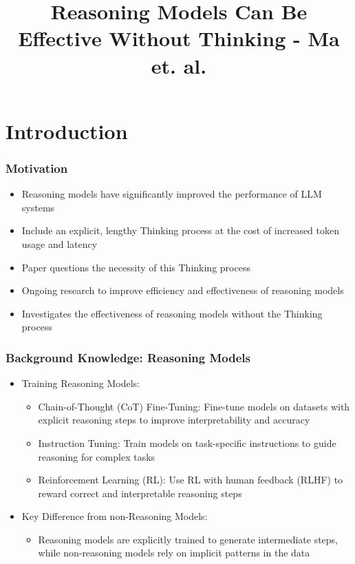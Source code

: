 \documentclass[student, noshadow, lsr, english, aspectratio=169]{ITR_LSR_slides}
\title{Reasoning Models Can Be Effective Without Thinking - Ma et. al.}
\begin{document}
\begin{frame}
    \titlepage
\end{frame}


\section{Introduction}

\begin{frame}
	\frametitle{Motivation}
	\begin{itemize}
		\item Reasoning models have significantly improved the performance of LLM systems
		\item Include an explicit, lengthy Thinking process at the cost of increased token usage and latency
		\item Paper questions the necessity of this Thinking process
		\item Ongoing research to improve efficiency and effectiveness of reasoning models
		\item Investigates the effectiveness of reasoning models without the Thinking process
	\end{itemize}
\end{frame}

\begin{frame}
    \frametitle{Background Knowledge: Reasoning Models}
    \begin{itemize}
        \item Training Reasoning Models:
            \begin{itemize}
                \item Chain-of-Thought (CoT) Fine-Tuning: Fine-tune models on datasets with explicit reasoning steps to improve interpretability and accuracy
				\item Instruction Tuning: Train models on task-specific instructions to guide reasoning for complex tasks
				\item Reinforcement Learning (RL): Use RL with human feedback (RLHF) to reward correct and interpretable reasoning steps
            \end{itemize}
        \item Key Difference from non-Reasoning Models:
            \begin{itemize}
                \item Reasoning models are explicitly trained to generate intermediate steps, while non-reasoning models rely on implicit patterns in the data
            \end{itemize}
    \end{itemize}
\end{frame}
\end{document}
